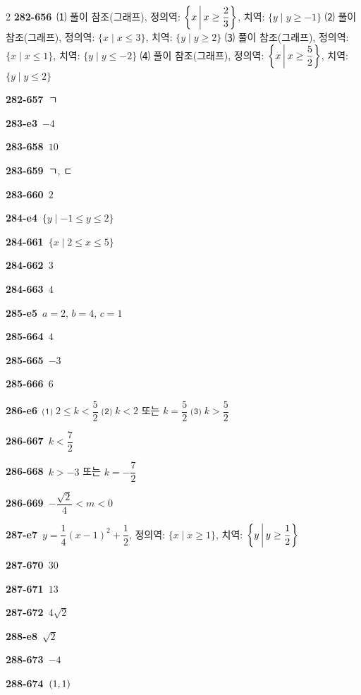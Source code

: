 \documentclass[10pt,a4paper]{article}
\begin{document}
\begin{multicols}{2}
\noindent\textbf{282-656}\ ⑴ 풀이 참조(그래프), 정의역: $\left\{x \mkern3mu \middle|\mkern3mu  x\ge \dfrac{2}{3}\right\}$, 치역: $\{y \mid y\ge -1\}$ ⑵ 풀이 참조(그래프), 정의역: $\{x \mid x\le 3\}$, 치역: $\{y \mid y\ge 2\}$ ⑶ 풀이 참조(그래프), 정의역: $\{x \mid x\le 1\}$, 치역: $\{y \mid y\le -2\}$ ⑷ 풀이 참조(그래프), 정의역: $\left\{x \mkern3mu \middle|\mkern3mu  x\ge \dfrac{5}{2}\right\}$, 치역: $\{y \mid y\le 2\}$\par
\noindent\textbf{282-657}\ ㄱ\par
\noindent\textbf{283-e3}\ $-4$\par
\noindent\textbf{283-658}\ $10$\par
\noindent\textbf{283-659}\ ㄱ, ㄷ\par
\noindent\textbf{283-660}\ $2$\par
\noindent\textbf{284-e4}\ $\{y \mid -1\le y\le 2\}$\par
\noindent\textbf{284-661}\ $\{x \mid 2\le x\le 5\}$\par
\noindent\textbf{284-662}\ $3$\par
\noindent\textbf{284-663}\ $4$\par
\noindent\textbf{285-e5}\ $a=2$, $b=4$, $c=1$\par
\noindent\textbf{285-664}\ $4$\par
\noindent\textbf{285-665}\ $-3$\par
\noindent\textbf{285-666}\ $6$\par
\noindent\textbf{286-e6}\ ⑴ $2\le k<\dfrac{5}{2}$ ⑵ $k<2$ 또는 $k=\dfrac{5}{2}$ ⑶ $k>\dfrac{5}{2}$\par
\noindent\textbf{286-667}\ $k<\dfrac{7}{2}$\par
\noindent\textbf{286-668}\ $k>-3$ 또는 $k=-\dfrac{7}{2}$\par
\noindent\textbf{286-669}\ $-\dfrac{\sqrt{2}}{4}<m<0$\par
\noindent\textbf{287-e7}\ $y=\dfrac{1}{4}(x-1)^2+\dfrac{1}{2}$, 정의역: $\{x \mid x\ge 1\}$, 치역: $\left\{y \mkern3mu \middle|\mkern3mu  y\ge \dfrac{1}{2}\right\}$\par
\noindent\textbf{287-670}\ $30$\par
\noindent\textbf{287-671}\ $13$\par
\noindent\textbf{287-672}\ $4\sqrt{2}$\par
\noindent\textbf{288-e8}\ $\sqrt{2}$\par
\noindent\textbf{288-673}\ $-4$\par
\noindent\textbf{288-674}\ $(1{,}\mkern3mu\mathopen{}1)$\par

\end{multicols}
\end{document}

